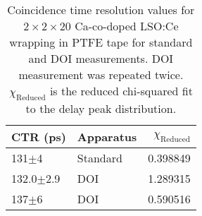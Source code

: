 \begin{table}
\caption{\label{tab:referencevals} Coincidence time resolution values for $2\times2\times20$ Ca-co-doped LSO:Ce wrapping in PTFE tape for standard and DOI measurements. DOI measurement was repeated twice. $\chi_\text{Reduced}$ is the reduced chi-squared fit to the delay peak distribution.}
\begin{tabular}{llr}
\hline
       CTR (ps) &   Apparatus &  $\chi_\text{Reduced}$ \\
\hline
     131$\pm$4 &  Standard &    0.398849 \\
 132.0$\pm$2.9 &   DOI &    1.289315 \\
     137$\pm$6 &   DOI &    0.590516 \\
\hline
\end{tabular}
\end{table}